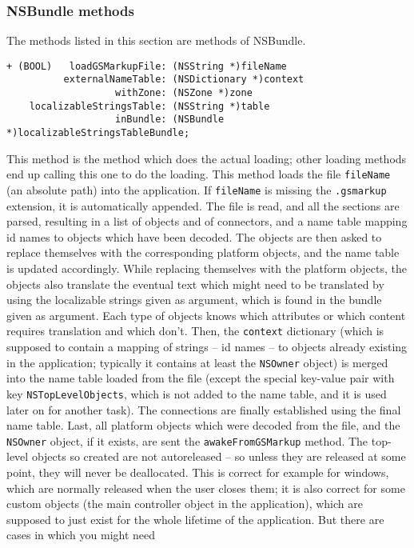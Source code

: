 \subsubsection{NSBundle methods}
The methods listed in this section are methods of NSBundle.
\begin{verbatim}
+ (BOOL)   loadGSMarkupFile: (NSString *)fileName
          externalNameTable: (NSDictionary *)context
                   withZone: (NSZone *)zone
    localizableStringsTable: (NSString *)table
                   inBundle: (NSBundle *)localizableStringsTableBundle;
\end{verbatim}
This method is the method which does the actual loading; other loading
methods end up calling this one to do the loading.  This method loads
the file \texttt{fileName} (an absolute path) into the application.
If \texttt{fileName} is missing the \texttt{.gsmarkup} extension, it is
automatically appended.  The file is read, and all the sections are
parsed, resulting in a list of objects and of connectors, and a name
table mapping id names to objects which have been decoded.  The
objects are then asked to replace themselves with the corresponding
platform objects, and the name table is updated accordingly.  While
replacing themselves with the platform objects, the objects also
translate the eventual text which might need to be translated by using
the localizable strings given as argument, which is found in the
bundle given as argument.  Each type of objects knows which attributes
or which content requires translation and which don't.  Then, the
\texttt{context} dictionary (which is supposed to contain a mapping of
strings -- id names -- to objects already existing in the application;
typically it contains at least the \texttt{NSOwner} object) is merged
into the name table loaded from the file (except the special key-value
pair with key \texttt{NSTopLevelObjects}, which is not added to the
name table, and it is used later on for another task).  The
connections are finally established using the final name table.  Last,
all platform objects which were decoded from the file, and the
\texttt{NSOwner} object, if it exists, are sent the 
\texttt{awakeFromGSMarkup} method.  The top-level objects so created are
not autoreleased -- so unless they are released at some point, they
will never be deallocated.  This is correct for example for windows,
which are normally released when the user closes them; it is also
correct for some custom objects (the main controller object in the
application), which are supposed to just exist for the whole lifetime
of the application.  But there are cases in which you might need
